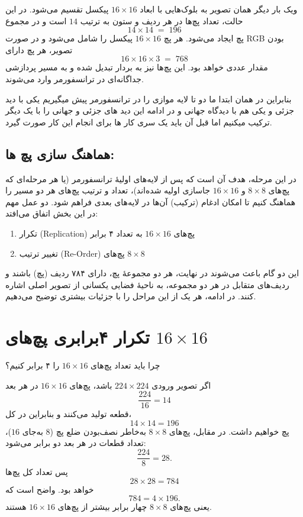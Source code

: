 ویک بار دیگر همان تصویر به بلوک‌هایی با ابعاد $16 \times 16$ پیکسل تقسیم می‌شود. در این حالت، تعداد پچ‌ها در هر ردیف و ستون به ترتیب 
$14$ است و در مجموع
\[
14 \times 14 \;=\; 196
\]
پچ ایجاد می‌شود. هر پچ $16 \times 16$ پیکسل را شامل می‌شود و در صورت RGB بودن تصویر، هر پچ دارای
\[
16 \times 16 \times 3 \;=\; 768
\]
مقدار عددی خواهد بود. این پچ‌ها نیز به بردار تبدیل شده و به مسیر پردازشی جداگانه‌ای در ترانسفورمر وارد می‌شوند.

بنابراین در همان ابتدا ما دو تا لایه موازی را در ترانسفورمر پیش میگیریم
یکی با دید جزئی و یکی هم با دیدگاه جهانی و در ادامه این دید های جزئی و جهانی را با یک دیگر ترکیب میکنیم اما قبل آن باید یک سری کار ها برای انجام این کار صورت گیرد.

\subsection{هماهنگ سازی پچ ها:}

در این مرحله، هدف آن است که پس از لایه‌های اولیهٔ ترانسفورمر (یا هر مرحله‌ای که پچ‌های $8 \times 8$ و $16 \times 16$ جاسازی اولیه شده‌اند)، تعداد و ترتیب پچ‌های هر دو مسیر را هماهنگ کنیم تا امکان ادغام (ترکیب) آن‌ها در لایه‌های بعدی فراهم شود. دو عمل مهم در این بخش اتفاق می‌افتد:
\begin{enumerate}
	\item تکرار (Replication) پچ‌های $16 \times 16$ به تعداد ۴ برابر
	\item تغییر ترتیب (Re-Order) پچ‌های $8 \times 8$
\end{enumerate}

این دو گام باعث می‌شوند در نهایت، هر دو مجموعهٔ پچ، دارای ۷۸۴ ردیف (پچ) باشند و ردیف‌های متقابل در هر دو مجموعه، به ناحیهٔ فضایی یکسانی از تصویر اصلی اشاره کنند. در ادامه، هر یک از این مراحل را با جزئیات بیشتری توضیح می‌دهیم.

\section*{تکرار ۴برابری پچ‌های \texorpdfstring{$16 \times 16$}{16x16}}

چرا باید تعداد پچ‌های $16 \times 16$ را ۴ برابر کنیم؟

اگر تصویر ورودی $224 \times 224$ باشد، پچ‌های $16 \times 16$ در هر بعد 
\[
\frac{224}{16} = 14
\]
قطعه تولید می‌کنند و بنابراین در کل، 
\[
14 \times 14 = 196
\]
پچ خواهیم داشت. در مقابل، پچ‌های $8 \times 8$ به‌خاطر نصف‌بودن ضلع پچ ($8$ به‌جای $16$)، تعداد قطعات در هر بعد دو برابر می‌شود:
\[
\frac{224}{8} = 28.
\]
پس تعداد کل پچ‌ها 
\[
28 \times 28 = 784
\]
خواهد بود. واضح است که
\[
784 = 4 \times 196.
\]
یعنی پچ‌های $8 \times 8$ چهار برابر بیشتر از پچ‌های $16 \times 16$ هستند. 

